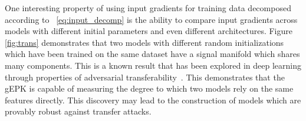 
One interesting property of using input gradients for training data decomposed according to ~\eqref{eq:input_decomp} is the ability to compare input gradients across models with different initial parameters and even different architectures.
Figure \ref{fig:trans} demonstrates that two models with different random initializations which have been trained on the same dataset have a signal manifold which shares many components.
This is a known result that has been explored in deep learning through properties of adversarial transferability~\citet{szegedy2013intriguing}.
This demonstrates that the gEPK is capable of measuring the degree to which two models rely on the same features directly.
This discovery may lead to the construction of models which are provably robust against transfer attacks.



